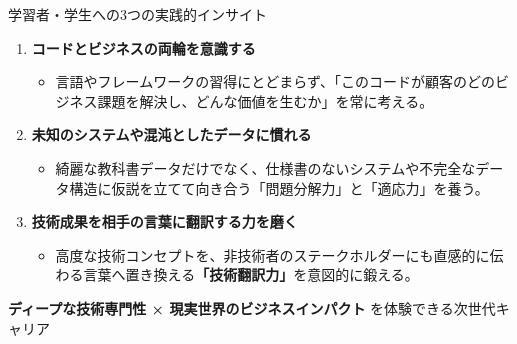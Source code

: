 \documentclass[aspectratio=169,11pt]{beamer}
\begin{document}
\begin{frame}{学習者・学生への3つの実践的インサイト}
  \begin{enumerate}
    \item \textbf{コードとビジネスの両輪を意識する}
      \begin{itemize}
        \item 言語やフレームワークの習得にとどまらず、「このコードが顧客のどのビジネス課題を解決し、どんな価値を生むか」を常に考える。
      \end{itemize}
    \vspace{0.4em}
    \item \textbf{未知のシステムや混沌としたデータに慣れる}
      \begin{itemize}
        \item 綺麗な教科書データだけでなく、仕様書のないシステムや不完全なデータ構造に仮説を立てて向き合う「問題分解力」と「適応力」を養う。
      \end{itemize}
    \vspace{0.4em}
    \item \textbf{技術成果を相手の言葉に翻訳する力を磨く}
      \begin{itemize}
        \item 高度な技術コンセプトを、非技術者のステークホルダーにも直感的に伝わる言葉へ置き換える\textbf{「技術翻訳力」}を意図的に鍛える。
      \end{itemize}
  \end{enumerate}

  \vspace{0.4em}
  \begin{center}
    \alert{\textbf{ディープな技術専門性 × 現実世界のビジネスインパクト}} を体験できる次世代キャリア
  \end{center}
\end{frame}
\end{document}

